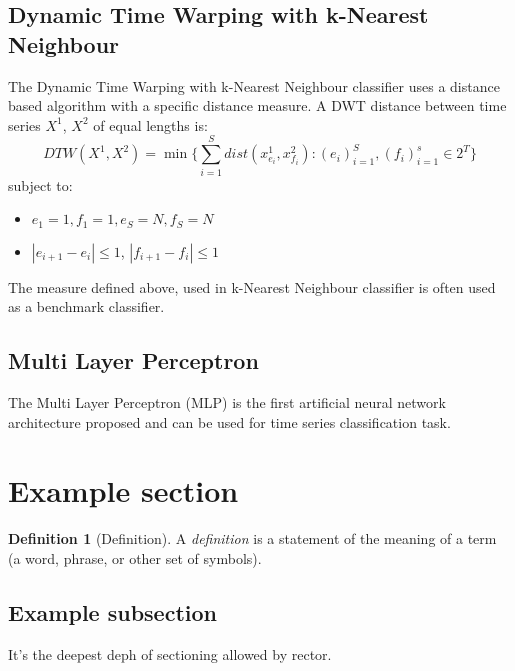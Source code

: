 \documentclass[a4paper,11pt,twoside]{report}
\theoremstyle{definition}
\newtheorem{definition}[theorem]{Definition}
\begin{document}
\subsection{Dynamic Time Warping with k-Nearest Neighbour}
The Dynamic Time Warping with k-Nearest Neighbour classifier uses a distance based algorithm with a specific distance measure. A DWT distance between time series $X^1$, $X^2$ of equal lengths is:
$$DTW(X^1, X^2) = \min\{ \sum_{i=1}^S dist(x^1_{e_i}, x^2_{f_i}):(e_i)_{i=1}^S, (f_i)_{i=1}^ s\in 2^T\}$$
subject to:
\begin{itemize}
\item $e_1 = 1, f_1 = 1, e_S= N, f_S = N$
\item $|e_{i+1} - e_i | \leq 1$, $|f_{i+1} - f_i | \leq 1$
\end{itemize}
The measure defined above, used in k-Nearest Neighbour classifier is often used as a benchmark classifier. 
\subsection{Multi Layer Perceptron}
The Multi Layer Perceptron (MLP) is the first artificial neural network architecture proposed and can be used for time series classification task. 

\section{Example section}

\begin{definition}[Definition]
	A \emph{definition} is a statement of the meaning of a term (a word, phrase, or other set of symbols).
\end{definition}

\subsection{Example subsection}

It's the deepest deph of sectioning allowed by rector.
\end{document}
